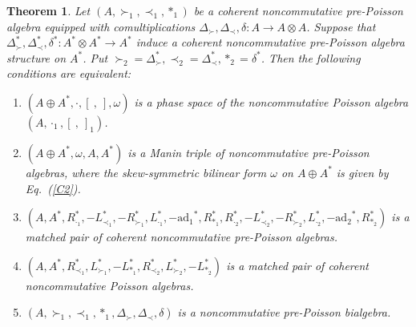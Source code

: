 \documentclass[12pt]{amsart}
\newtheorem{thm}{Theorem}[section]
\theoremstyle{definition}
\begin{document}
\begin{thm} \label{Mb3} Let $(A, \succ_1,\prec_1,\ast_1)$ be a coherent noncommutative pre-Poisson algebra
equipped with comultiplications $\Delta_{\succ},\Delta_{\prec},\delta:A\longrightarrow
A\otimes A$. Suppose that $\Delta_{\succ}^{*},\Delta_{\prec}^{*},\delta^{*}:A^{*}\otimes
A^{*}\longrightarrow A^{*}$ induce a coherent noncommutative pre-Poisson algebra structure
on $A^{*}$. Put $\succ_2=\Delta_{\succ}^{*},\prec_2=\Delta_{\prec}^{*},\ast_2=\delta^{*}$. Then the
following conditions are equivalent:
\begin{enumerate}
	\item\label{Ea1} $(A\oplus A^{*},\cdot,[ \ , \ ],\omega)$ is a phase space of the noncommutative Poisson algebra $(A,\cdot_1, [ \ , \ ]_1)$.
\item\label{Ea2} $(A\oplus A^{*},\omega,A,A^{*})$ is a Manin triple of noncommutative pre-Poisson algebras, 
where the skew-symmetric bilinear form $\omega$ on $A\oplus A^{*}$ is given by Eq.~(\ref{C2}).
\item\label{Ea3}
$(A, A^{*}, R_{\cdot_1}^{*},-L_{\prec_1}^{*},-R_{\succ_1}^{*},L_{\cdot_1}^{*},-\mathrm{ad_1}^{*},R^{*}_{\ast_1},
 R_{\cdot_2}^{*},-L_{\prec_2}^{*},-R_{\succ_2}^{*},L_{\cdot_2}^{*},-\mathrm{ad_2}^{*},R^{*}_{\ast_2})$ 
 is a matched pair of coherent noncommutative pre-Poisson algebras.
 \item\label{Ea4}
$(A, A^{*},R_{\prec_1}^{*}, L_{\succ_1}^{*},-L_{\ast_1}^{*},R_{\prec_2}^{*},L_{\succ_2}^{*},-L_{\ast_2}^{*}) $ is a matched pair of coherent 
noncommutative Poisson algebras.
	\item\label{Ea5} $(A, \succ_1,\prec_1,\ast_1,\Delta_{\succ},\Delta_{\prec},\delta)$ is a noncommutative pre-Poisson bialgebra.
\end{enumerate}
\end{thm}
\end{document}
